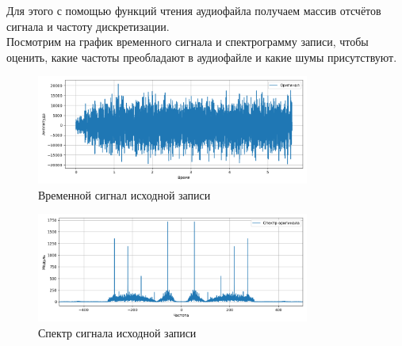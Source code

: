 \documentclass[a4paper]{article}
\begin{document}
Для этого с помощью функций чтения аудиофайла получаем массив отсчётов сигнала и частоту дискретизации.\\[0.5em] 
Посмотрим на график временного сигнала и спектрограмму записи, чтобы оценить, какие частоты преобладают в аудиофайле и какие шумы присутствуют.
\begin{figure}[H]
    \centering
    \includegraphics[width=0.8\textwidth]{src/time_orig_rec.png}
    \caption{Временной сигнал исходной записи}
\end{figure}

\begin{figure}[H]
    \centering
    \includegraphics[width=0.8\textwidth]{src/spec_orig_rec.png}
    \caption{Спектр сигнала исходной записи}
\end{figure}
\end{document}
